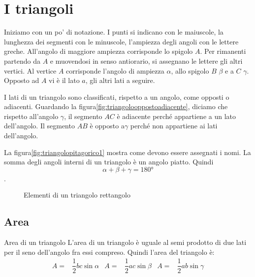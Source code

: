 \section{I triangoli}
Iniziamo con un po' di notazione. I punti si indicano con le  maiuscole, la lunghezza dei segmenti con le  minuscole,  l'ampiezza degli angoli con le lettere greche. All'angolo di maggiore  ampiezza corrisponde lo spigolo $A$. Per rimanenti partendo da $A$ e muovendosi in senso antiorario, si assegnano le lettere gli altri vertici. Al vertice $A$ corrisponde l'angolo di ampiezza $\alpha$, allo spigolo $B$ $\beta$ e a $C$ $\gamma$. Opposto ad $A$ vi è il lato $a$, gli altri lati a seguire.\par 
I lati di un triangolo sono classificati, rispetto a un angolo, come opposti o adiacenti. Guardando la figura\nobs\vref{fig:triangolooppostoadiacente}, diciamo che rispetto all'angolo $\gamma$, il segmento $AC$ è adiacente perché appartiene a un  lato dell'angolo. Il segmento  $AB$ è opposto a$\gamma$ perché  non appartiene ai lati  dell'angolo.\par
  La figura\nobs\vref{fig:triangolopitagorico1} mostra come devono essere assegnati i nomi.
La somma degli angoli interni di un triangolo è un angolo piatto. Quindi \[\alpha+\beta+\gamma=\ang{180}\]. 
\begin{figure}
	\centering
	
	\caption{Elementi di un triangolo rettangolo}
	\label{fig:triangolooppostoadiacente}
\end{figure}
\subsection{Area}
\begin{teoremat}{Area di un triangolo}{}
	L'area di un triangolo è uguale al semi prodotto di due lati per il seno dell'angolo fra essi compreso. 
	Quindi l'area del triangolo è:
	\begin{align*}
	A=&\dfrac{1}{2}bc\sin\alpha& A=&\dfrac{1}{2}ac\sin\beta& A=&\dfrac{1}{2}ab\sin\gamma \\
	\end{align*}
\end{teoremat}	
